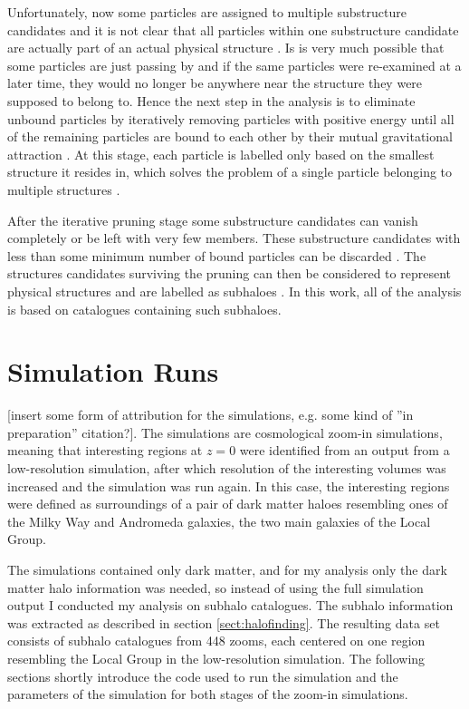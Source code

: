 \documentclass[english, oneside]{HYgradu}
\begin{document}
Unfortunately, now some particles are assigned to multiple substructure candidates and it is not clear that all particles within one substructure candidate are actually part of an actual physical structure \citep{springel2001populating}. Is is very much possible that some particles are just passing by and if the same particles were re-examined at a later time, they would no longer be anywhere near the structure they were supposed to belong to. Hence the next step in the analysis is to eliminate unbound particles by iteratively removing particles with positive energy until all of the remaining particles are bound to each other by their mutual gravitational attraction \citep{springel2001populating}. At this stage, each particle is labelled only based on the smallest structure it resides in, which solves the problem of a single particle belonging to multiple structures \citep{springel2001populating}.

After the iterative pruning stage some substructure candidates can vanish completely or be left with very few members. These substructure candidates with less than some minimum number of bound particles can be discarded \citep{springel2001populating}. The structures candidates surviving the pruning can then be considered to represent physical structures and are labelled as subhaloes \citep{springel2001populating}. In this work, all of the analysis is based on catalogues containing such subhaloes. 

\section{Simulation Runs}
[insert some form of attribution for the simulations, e.g. some kind of ''in preparation'' citation?]. The simulations are cosmological zoom-in simulations, meaning that interesting regions at $z=0$ were identified from an output from a low-resolution simulation, after which resolution of the interesting volumes was increased and the simulation was run again. In this case, the interesting regions were defined as surroundings of a pair of dark matter haloes resembling ones of the Milky Way and Andromeda galaxies, the two main galaxies of the Local Group.

The simulations contained only dark matter, and for my analysis only the dark matter halo information was needed, so instead of using the full simulation output I conducted my analysis on subhalo catalogues. The subhalo information was extracted as described in section \ref{sect:halofinding}. The resulting data set consists of subhalo catalogues from 448 zooms, each centered on one region resembling the Local Group in the low-resolution simulation. The following sections shortly introduce the code used to run the simulation and the parameters of the simulation for both stages of the zoom-in simulations.
\end{document}
